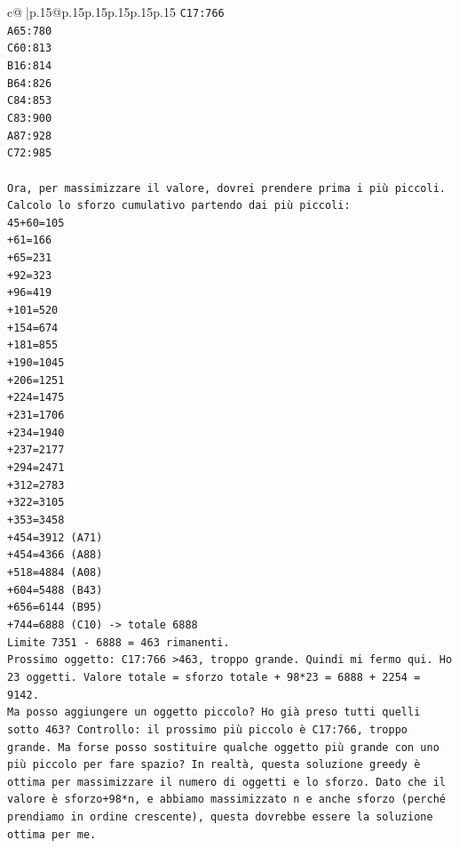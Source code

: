 \documentclass{article}
\begin{document}
{\begin{supertabular}{c@{$\;$}|p{.15\linewidth}@{}p{.15\linewidth}p{.15\linewidth}p{.15\linewidth}p{.15\linewidth}p{.15\linewidth}}
{{{\texttt{C17:766} \\
\texttt{A65:780} \\
\texttt{C60:813} \\
\texttt{B16:814} \\
\texttt{B64:826} \\
\texttt{C84:853} \\
\texttt{C83:900} \\
\texttt{A87:928} \\
\texttt{C72:985} \\
\\ 
\texttt{Ora, per massimizzare il valore, dovrei prendere prima i più piccoli. Calcolo lo sforzo cumulativo partendo dai più piccoli:} \\
\texttt{45+60=105} \\
\texttt{+61=166} \\
\texttt{+65=231} \\
\texttt{+92=323} \\
\texttt{+96=419} \\
\texttt{+101=520} \\
\texttt{+154=674} \\
\texttt{+181=855} \\
\texttt{+190=1045} \\
\texttt{+206=1251} \\
\texttt{+224=1475} \\
\texttt{+231=1706} \\
\texttt{+234=1940} \\
\texttt{+237=2177} \\
\texttt{+294=2471} \\
\texttt{+312=2783} \\
\texttt{+322=3105} \\
\texttt{+353=3458} \\
\texttt{+454=3912 (A71)} \\
\texttt{+454=4366 (A88)} \\
\texttt{+518=4884 (A08)} \\
\texttt{+604=5488 (B43)} \\
\texttt{+656=6144 (B95)} \\
\texttt{+744=6888 (C10) {-}> totale 6888} \\
\texttt{Limite 7351 {-} 6888 = 463 rimanenti.} \\
\texttt{Prossimo oggetto: C17:766 >463, troppo grande. Quindi mi fermo qui. Ho 23 oggetti. Valore totale = sforzo totale + 98*23 = 6888 + 2254 = 9142.} \\
\texttt{Ma posso aggiungere un oggetto piccolo? Ho già preso tutti quelli sotto 463? Controllo: il prossimo più piccolo è C17:766, troppo grande. Ma forse posso sostituire qualche oggetto più grande con uno più piccolo per fare spazio? In realtà, questa soluzione greedy è ottima per massimizzare il numero di oggetti e lo sforzo. Dato che il valore è sforzo+98*n, e abbiamo massimizzato n e anche sforzo (perché prendiamo in ordine crescente), questa dovrebbe essere la soluzione ottima per me.} \\
}}}
\end{supertabular}}
\end{document}
